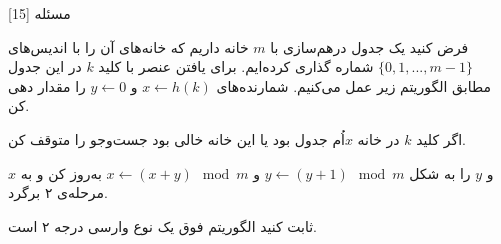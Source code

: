 ‌مسئله [15]


% 
%
%
% 
فرض کنید یک جدول درهم‌سازی با
$m$
خانه داریم که خانه‌های آن را با اندیس‌های
$\{0, 1, ..., m-1\}$
شماره گذاری کرده‌ایم.
برای یافتن عنصر با کلید
$k$
در این جدول مطابق الگوریتم زیر عمل می‌کنیم.
شمارنده‌های
$x \leftarrow h(k)$
و
$y \leftarrow 0$
را مقدار دهی کن.

اگر کلید
$k$
در خانه
$x$اُم
جدول بود یا این خانه خالی بود جست‌وجو را متوقف کن.

$x$ و $y$
را به شکل
$y \leftarrow (y + 1) \mod{m}$
و
$x \leftarrow (x + y) \mod{m}$
به‌روز کن و به مرحله‌ی ۲ برگرد.

ثابت کنید الگوریتم فوق یک نوع وارسی درجه ۲ است.


